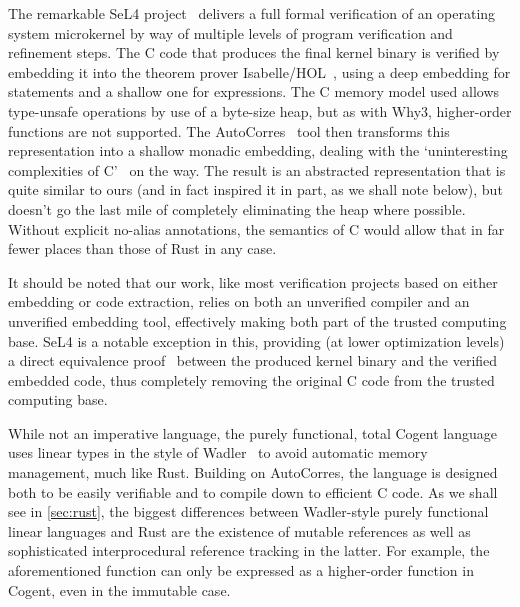 The remarkable SeL4 project~\cite{klein2009sel4} delivers a full formal verification of an operating
system microkernel by way of multiple levels of program verification and
refinement steps. The C code that produces the final kernel binary is verified
by embedding it into the theorem prover
Isabelle/HOL~\cite{nipkow2002isabelle}, using a deep embedding for statements
and a shallow one for expressions. The C memory model used allows type-unsafe
operations by use of a byte-size heap, but as with Why3, higher-order functions are
not supported. The AutoCorres~\cite{greenaway2012bridging, greenaway2014don}
tool then transforms this representation into a shallow monadic embedding,
dealing with the `uninteresting complexities of C'~\cite{greenaway2014don} on the
way. The result is an abstracted representation that is quite similar to ours
(and in fact inspired it in part, as we shall note below), but doesn't go the
last mile of completely eliminating the heap where possible. Without explicit
no-alias annotations, the semantics of C would allow that in far fewer places than those
of Rust in any case.

It should be noted that our work, like most verification projects based on
either embedding or code extraction, relies on both
an unverified compiler and an unverified embedding tool, effectively making both
part of the trusted computing base. SeL4 is a notable exception in this,
providing (at lower optimization levels) a direct equivalence proof~\cite{sewell2013translation} between the
produced kernel binary and the verified embedded code, thus completely removing
the original C code from the trusted computing base.

While not an imperative language, the purely functional, total Cogent language~\cite{o2016refinement}
uses linear types in the style of Wadler~\cite{wadler1990linear} to avoid
automatic memory management, much like Rust. Building
on AutoCorres, the language is designed both to be easily verifiable and to
compile down to efficient C code. As we shall see in \autoref{sec:rust}, the
biggest differences between Wadler-style purely functional linear languages and Rust are the
existence of mutable references as well as sophisticated interprocedural
reference tracking in the latter. For example, the aforementioned 
function can only be expressed as a higher-order function in Cogent, even in the immutable case.